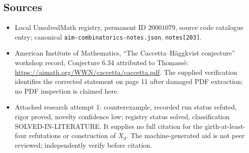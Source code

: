 \documentclass[11pt]{article}
\begin{document}
\subsection{Sources}
\begin{itemize}
\item Local UnsolvedMath registry, permanent ID $20001079$, source code catalogue entry; canonical \texttt{aim-combinatorics-notes.json}, \texttt{notes[203]}.
\item American Institute of Mathematics, ``The Caccetta--H\"aggkvist conjecture'' workshop record, Conjecture 6.34 attributed to Thomass\'e: \url{https://aimath.org/WWN/caccetta/caccetta.pdf}. The supplied verification identifies the corrected statement on page 11 after damaged PDF extraction; no PDF inspection is claimed here.
\item Attached research attempt 1: counterexample, recorded run status refuted, rigor proved, novelty confidence low; registry status solved, classification SOLVED-IN-LITERATURE. It supplies no full citation for the girth-at-least-four refutations or construction of $X_d$. The machine-generated aid is not peer reviewed; independently verify before citation.
\end{itemize}
\end{document}
